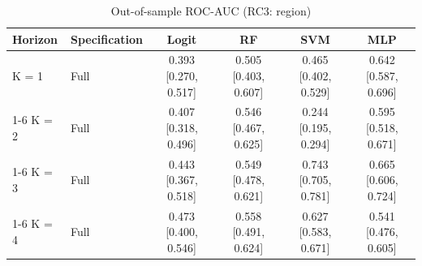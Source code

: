 \begin{table}

\caption{\label{tab:roc_ci_rc3}Out-of-sample ROC-AUC (RC3: region)}
\centering
\begin{tabular}[t]{llcccc}
\toprule
Horizon & Specification & Logit & RF & SVM & MLP\\
\midrule
K = 1 & Full & 0.393 [0.270, 0.517] & 0.505 [0.403, 0.607] & 0.465 [0.402, 0.529] & 0.642 [0.587, 0.696]\\
\cmidrule{1-6}
K = 2 & Full & 0.407 [0.318, 0.496] & 0.546 [0.467, 0.625] & 0.244 [0.195, 0.294] & 0.595 [0.518, 0.671]\\
\cmidrule{1-6}
K = 3 & Full & 0.443 [0.367, 0.518] & 0.549 [0.478, 0.621] & 0.743 [0.705, 0.781] & 0.665 [0.606, 0.724]\\
\cmidrule{1-6}
K = 4 & Full & 0.473 [0.400, 0.546] & 0.558 [0.491, 0.624] & 0.627 [0.583, 0.671] & 0.541 [0.476, 0.605]\\
\bottomrule
\end{tabular}
\end{table}
